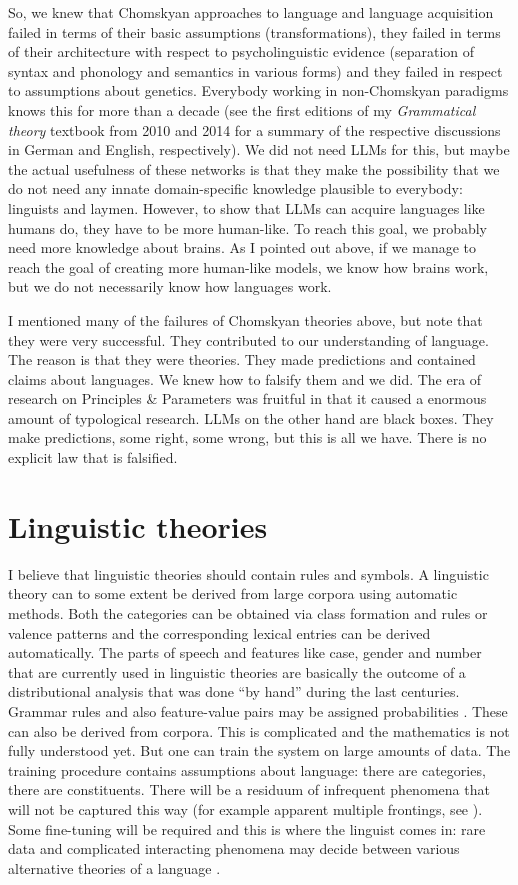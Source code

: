 So, we knew that Chomskyan approaches to language and language acquisition failed in terms of their
basic assumptions (transformations), they failed in terms of their architecture with respect to
psycholinguistic evidence (separation of syntax and phonology and semantics in various forms) and
they failed in respect to assumptions about genetics. Everybody working in non-Chomskyan paradigms
knows this for more than a decade (see the first editions of my \emph{Grammatical theory} textbook
from 2010 and 2014 for a summary of the
respective discussions in German and English, respectively). We did not need LLMs for this, but maybe the actual usefulness of these networks is that
they make the possibility that we do not need any innate domain-specific knowledge plausible to
everybody: linguists and laymen. However, to show that LLMs can acquire languages like humans do, they have
to be more human-like. To reach this goal, we probably need more knowledge about brains. As I
pointed out above, if we manage to reach the goal of creating more human-like models, we know how
brains work, but we do not necessarily know how languages work.

I mentioned many of the failures of Chomskyan theories above, but note that they were very
successful. They contributed to our understanding of language. The reason is that they were
theories. They made predictions and contained claims about languages. We knew how to falsify them
and we did. The era of research on Principles \& Parameters was fruitful in that it caused a
enormous amount of typological research. LLMs on the other hand are black boxes. They make
predictions, some right, some wrong, but this is all we have. There is no explicit law that is falsified.

\section{Linguistic theories}

I believe that linguistic theories should contain rules and symbols. A linguistic theory can to some
extent be derived from large corpora using automatic methods. Both the categories can be obtained
via class formation and rules or valence patterns and the corresponding lexical entries can be
derived automatically. The parts of speech and features like case, gender and
number that are currently used in linguistic theories are basically the outcome of a distributional
analysis that was done ``by hand'' during the last centuries. Grammar rules and also feature-value
pairs may be assigned probabilities \citep{Jurafsky96a}. These can also be derived from corpora. This is complicated and
the mathematics is not fully understood yet. But one can train the system on large amounts of
data. The training procedure contains assumptions about language: there are categories, there are
constituents. There will be a residuum of infrequent phenomena that will not be captured
this way (for example apparent multiple frontings, see \citealt{Mueller2003b}). Some fine-tuning will be
required and this is where the linguist comes in: rare data and complicated interacting phenomena may decide between various alternative
theories of a language \citep[Chapter~6]{MuellerGS}. 

